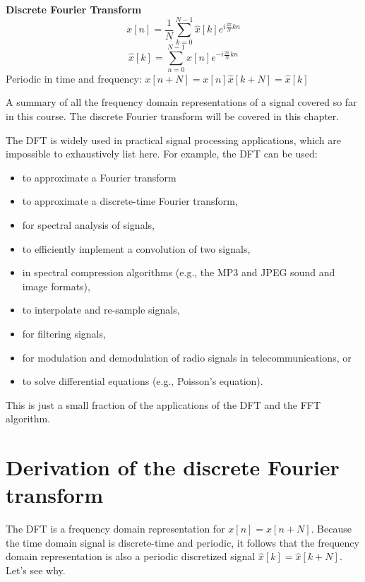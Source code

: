 \begin{marginfigure}
\noindent \textbf{Discrete Fourier Transform}
\newline 
\begin{equation*}
x[n] = \frac{1}{N}\sum_{k=0}^{N-1}\hat{x}[k] e^{i\frac{2\pi}{N}kn}
\end{equation*} 
\begin{equation*}
\hat{x}[k] = \sum_{n=0}^{N-1}x[n] e^{-i\frac{2\pi}{N}kn}
\end{equation*} \newline
Periodic in time and frequency: \newline$x[n+ N]=x[n]$\newline $\hat{x}[k+ N]=\hat{x}[k]$
\newline
\noindent \hrulefill

\caption{A summary of all the frequency domain representations of a signal covered so far in this course. The discrete Fourier transform will be covered in this chapter.}
\label{fig:summary_fourier}
\end{marginfigure}

The DFT is widely used in practical signal processing applications,
which are impossible to exhaustively list here. For example, the DFT
can be used:
\begin{itemize}
\item to approximate a Fourier transform
\item to approximate a discrete-time Fourier transform,
\item for spectral analysis of signals, 
\item to efficiently implement a convolution of two signals, 
\item in spectral  compression algorithms (e.g., the MP3 and JPEG sound and image formats),
\item to interpolate and re-sample signals,
\item for filtering signals,
\item for modulation and demodulation of radio signals in telecommunications, or
\item to solve differential equations (e.g., Poisson's equation).
\end{itemize}
This is just a small fraction of the applications of the DFT and the FFT algorithm.

\section{Derivation of the discrete Fourier transform}

The DFT is a frequency domain representation for  $x[n]=x[n+N]$. Because the time domain signal is
discrete-time and periodic, it follows that the frequency domain
representation is also a periodic discretized signal
$\hat{x}[k]=\hat{x}[k+N]$. Let's see why.

